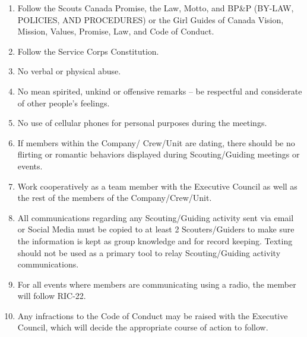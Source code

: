\documentclass{Service_Corps_Document}
\begin{document}
\def \Title {Code of Conduct}
\def \Company {Service Corps}
\def \versionNumber {3.0}
\stdFooter
\begin{titlepage}
	\stdTitlePage
\end{titlepage}
\begin{enumerate}
	\item Follow the Scouts Canada Promise, the Law, Motto, and BP\&P (BY-LAW, POLICIES, AND PROCEDURES) or the Girl Guides 	of Canada Vision, Mission, Values, Promise, Law, and Code of Conduct.
	\item Follow the Service Corps Constitution.
	\item No verbal or physical abuse.
	\item No mean spirited, unkind or offensive remarks – be respectful and considerate of other people’s feelings.
	\item No use of cellular phones for personal purposes during the meetings.
	\item If members within the Company/ Crew/Unit are dating, there should be no flirting or romantic behaviors displayed during Scouting/Guiding meetings or events.
	\item Work cooperatively as a team member with the Executive Council as well as the rest of the members of the Company/Crew/Unit.
	\item All communications regarding any Scouting/Guiding activity sent via email or Social Media must be copied to at least 2 Scouters/Guiders to make sure the information is kept as group knowledge and for record keeping. Texting should not be used as a primary tool to relay Scouting/Guiding activity communications.
	\item For all events where members are communicating using a radio, the member will follow RIC-22.
	\item Any infractions to the Code of Conduct may be raised with the Executive Council, which will decide the appropriate course of action to follow.
	      		
\end{enumerate}
\end{document}
